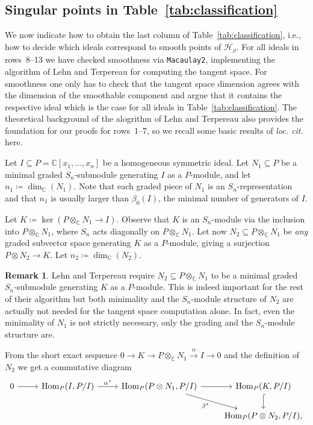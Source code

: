 \documentclass[11pt]{amsart}
\theoremstyle{definition}
\newtheorem{remark}[theorem]{Remark}
\newcommand{\CC}{\mathbb{C}}
\newcommand{\HH}{\mathcal{H}}
\DeclareMathOperator{\Hom}{Hom}
\begin{document}
\subsection{Singular points in Table~\ref{tab:classification}}
We now indicate how to obtain the last column of Table~\ref{tab:classification}, i.e., how to decide which ideals correspond to smooth points of $\HH_\rho$. For all ideals in rows~8--13 we have checked smoothness via \texttt{Macaulay2}, implementing the algorithm of Lehn and Terpereau \cite[Section~5]{LehnTerpereau} for computing the tangent space. For smoothness one only has to check that the tangent space dimension agrees with the dimension of the smoothable component and argue that it contains the respective ideal which is the case for all ideals in Table~\ref{tab:classification}. The theoretical background of the alogrithm of Lehn and Terpereau also provides the foundation for our proofs for rows~1--7, so we recall some basic results of \emph{loc. cit.} here.

Let $I \subseteq P = \CC[x_1, \ldots, x_n]$ be a homogeneous symmetric ideal. Let $N_1 \subseteq P$ be a minimal graded $S_n$-submodule generating $I$ as a $P$-module, and let $n_1 \coloneqq \dim_\CC(N_1)$. Note that each graded piece of $N_1$ is an $S_n$-representation and that $n_1$ is usually larger than $\beta_0(I)$, the minimal number of generators of $I$.

Let $K \coloneqq \ker(P \otimes_\CC N_1 \rightarrow I)$. Observe that $K$ is an $S_n$-module via the inclusion into $P \otimes_\CC N_1$, where $S_n$ acts diagonally on $P \otimes_\CC N_1$. Let now $N_2 \subseteq P \otimes_\CC N_1$ be \emph{any} graded subvector space generating $K$ as a $P$-module, giving a surjection $P \otimes N_2 \rightarrow K$. Let $n_2 \coloneqq \dim_\CC(N_2)$. 

\begin{remark}
    Lehn and Terpereau require $N_2 \subseteq P \otimes_\CC N_1$ to be a minimal graded $S_n$-submodule generating $K$ as a $P$-module. This is indeed important for the rest of their algorithm but both minimality and the $S_n$-module structure of $N_2$ are actually not needed for the tangent space computation alone. In fact, even the minimality of $N_1$ is not strictly necessary, only the grading and the $S_n$-module structure are.
\end{remark}

From the short exact sequence $0 \rightarrow K \rightarrow P \otimes_\CC N_1 \overset{\alpha}{\rightarrow} I \rightarrow 0$ and the definition of $N_2$ we get a commutative diagram
\begin{equation*}
    \begin{tikzcd}
    0 \arrow[r]
        &\Hom_P(I,P/I) \arrow[r,"\alpha^\ast"]
            &\Hom_P(P \otimes N_1, P/I) \arrow[r] \arrow[dr,"\beta^\ast"']
                &\Hom_P(K,P/I) \arrow[d,hook] \\
        &
            &
                &\Hom_P(P \otimes N_2, P/I),
\end{tikzcd}
\end{equation*}
\end{document}
